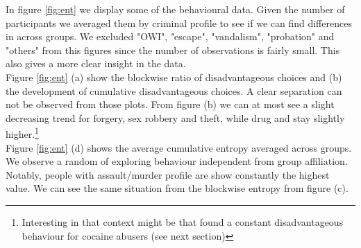 \documentclass[12pt,a4paper,bibliography=totocnumbered,listof=totocnumbered]{scrartcl}
\begin{document}
In figure \ref{fig:ent} we display some of the behavioural data. Given the number of participants we averaged them by criminal profile to see if we can find differences in across groups. We excluded "OWI", "escape", "vandalism", "probation" and "others" from this figures since the number of observations is fairly small. This also gives a more clear insight in the data.\\
Figure \ref{fig:ent} (a) show the blockwise ratio of disadvantageous choices and (b) the development of cumulative disadvantageous choices. A clear separation can not be observed from those plots. From figure (b) we can at most see a slight decreasing trend for forgery, sex robbery and theft, while drug and stay slightly higher.\footnote{Interesting in that context might be that \cite{stout2004} found a constant disadvantageous behaviour for cocaine abusers (see next section)}\\
Figure \ref{fig:ent} (d) shows the average cumulative entropy averaged across groups. We observe a random of exploring behaviour independent from group affiliation. Notably, people with assault/murder profile are show constantly the highest value. We can see the same situation from the blockwise entropy from figure (c).
\end{document}
